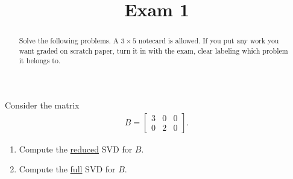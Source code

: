 \documentclass{ximera}
\begin{document}
    \title{Exam 1}
    
    \begin{abstract} Solve the following problems. A $3\times 5$ notecard is allowed.  If you put any work you want graded on scratch paper, turn it in with the exam, clear labeling which problem it belongs to. \end{abstract}
    \maketitle






\begin{exercise}
Consider the matrix 
\begin{align*}
    B = \begin{bmatrix}
            3 & 0 & 0 \\0 &2 &0
        \end{bmatrix}.
\end{align*}
\begin{enumerate}
    \item Compute the \underline{reduced} SVD for $B$.
    \vfill
    \item Compute the \underline{full} SVD for $B$.
    \vfill
\end{enumerate}
\end{exercise}
\end{document}

